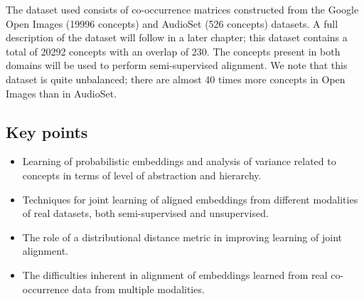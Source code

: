 The dataset used consists of co-occurrence matrices constructed from the Google Open Images (19996 concepts) \cite{openimages} and AudioSet (526 concepts) \cite{audioset} datasets. A full description of the dataset will follow in a later chapter; this dataset contains a total of 20292 concepts with an overlap of 230. The concepts present in both domains will be used to perform semi-supervised alignment. We note that this dataset is quite unbalanced; there are almost 40 times more concepts in Open Images than in AudioSet. 

\subsection{Key points}
\begin{itemize}
    \item Learning of probabilistic embeddings and analysis of variance related to concepts in terms of level of abstraction and hierarchy.
    \item Techniques for joint learning of aligned embeddings from different modalities of real datasets, both semi-supervised and unsupervised.
    \item The role of a distributional distance metric in improving learning of joint alignment.
    \item The difficulties inherent in alignment of embeddings learned from real co-occurrence data from multiple modalities. 
\end{itemize}
